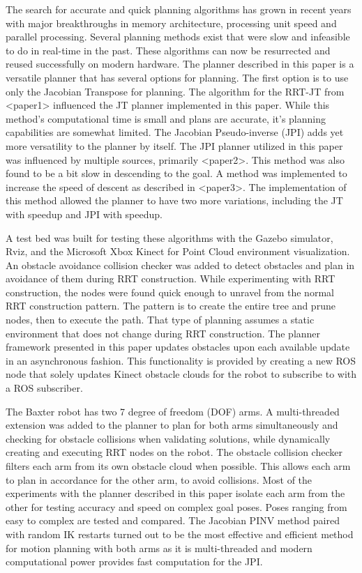 \documentclass[conference]{IEEEtran} \usepackage[T1]{fontenc} \usepackage[backend=biber, style=ieee]{biblatex}
\begin{document}
The search for accurate and quick planning algorithms has grown in recent years with major breakthroughs in memory architecture, processing unit speed and 
parallel processing. Several planning methods exist that were slow and infeasible to do in real-time in the past. These algorithms can now be resurrected and 
reused successfully on modern hardware. The planner described in this paper is a versatile planner that has several options for planning. The first option is to 
use only the Jacobian Transpose for planning. The algorithm for the RRT-JT from <paper1> influenced the JT planner implemented in this paper.  While this 
method's computational time is small and plans are accurate, it's planning capabilities are somewhat limited. The Jacobian Pseudo-inverse (JPI) adds yet more 
versatility to the planner by itself. The JPI planner utilized in this paper was influenced by multiple sources, primarily <paper2>. This method was also found to be a bit slow in descending to the goal. A method was implemented to increase the speed of descent as described in <paper3>. The implementation of this method allowed the planner to have two more variations, including the JT with speedup and JPI with speedup. 

A test bed was built for testing these algorithms with the Gazebo simulator, Rviz, and the Microsoft Xbox Kinect for Point Cloud environment visualization. An 
obstacle avoidance collision checker was added to detect obstacles and plan in avoidance of them during RRT construction. While experimenting with RRT 
construction, the nodes were found quick enough to unravel from the normal RRT construction pattern. The pattern is to create the entire tree and prune nodes, 
then to execute the path. That type of planning assumes a static environment that does not change during RRT construction. The planner framework presented in 
this paper updates obstacles upon each available update in an asynchronous fashion. This functionality is provided by creating a new ROS node that solely updates 
Kinect obstacle clouds for the robot to subscribe to with a ROS subscriber.

The Baxter robot has two 7 degree of freedom (DOF) arms. A multi-threaded extension was added to the planner to plan for both arms simultaneously and checking 
for obstacle collisions when validating solutions, while dynamically creating and executing RRT nodes on the robot. The obstacle collision checker filters 
each arm from its own obstacle cloud when possible. This allows each arm to plan in accordance for the other arm, to avoid collisions. Most of the experiments 
with the planner described in this paper isolate each arm from the other for testing accuracy and speed on complex goal poses. Poses ranging from easy to 
complex are tested and compared. The Jacobian PINV method paired with random IK restarts turned out to be the most effective and efficient method for motion 
planning with both arms as it is multi-threaded and modern computational power provides fast computation for the JPI.
\end{document}
